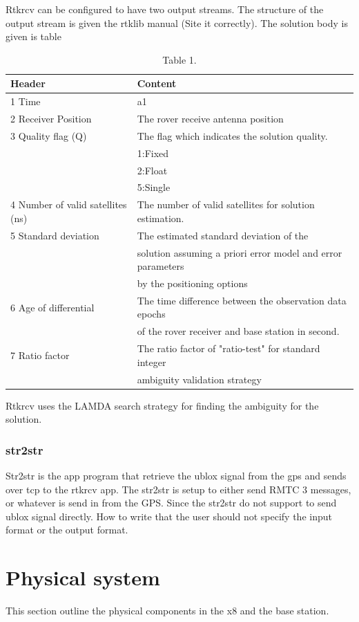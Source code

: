 Rtkrcv can be configured to have two output streams. The structure of the output stream is given the rtklib manual (Site it correctly). The solution body is given is table 
\begin{table}[!h]
\begin{center}
    \begin{tabular}{ | l | l |}
    \hline
    \textbf{Header} & \textbf{Content} \\ \hline
     1 Time & a1  \\ \hline
     2 Receiver Position & The rover receive antenna position \\ \hline
     3 Quality flag (Q) & The flag which indicates the solution quality.\\& 1:Fixed\\& 2:Float\\& 5:Single \\ \hline
     4 Number of valid satellites (ns) & The number of valid satellites for solution estimation. \\ \hline
     5 Standard deviation & The estimated standard deviation of the\\& solution assuming a priori error model and error parameters\\& by the positioning options \\ \hline
     6 Age of differential & The time difference between the observation data epochs\\& of the rover receiver and base station in second. \\ \hline
     7 Ratio factor & The ratio factor of "ratio-test" for standard integer\\& ambiguity validation strategy \\ \hline
    \end{tabular}
\end{center}
\caption{Table 1. }
\label{Tab1}
\end{table}
Rtkrcv uses the LAMDA search strategy for finding the ambiguity for the solution. 
\subsubsection{str2str}
Str2str is the app program that retrieve the ublox signal from the gps and sends over tcp to the rtkrcv app. The str2str is setup to either send RMTC 3 messages, or whatever is send in from the GPS. Since the str2str do not support to send ublox signal directly. How to write that the user should not specify the input format or the output format.
\section{Physical system}
This section outline the physical components in the x8 and the base station.
